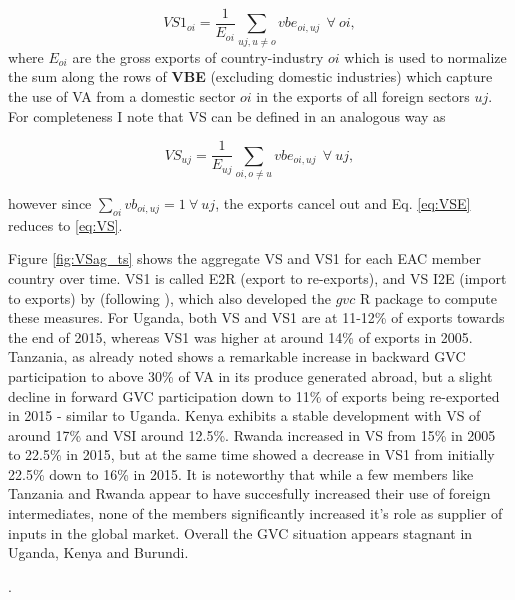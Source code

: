 \documentclass[a4paper]{article}
\begin{document}
\begin{equation} \label{eq:VS1}
VS1_{oi} = \frac{1}{E_{oi}} \sum_{uj, u \neq  o} vbe_{oi, uj}\ \ \forall\ oi,
\end{equation}
where $E_{oi}$ are the gross exports of country-industry $oi$ which is used to normalize the sum along the rows of \textbf{VBE} (excluding domestic industries) which capture the use of VA from a domestic sector $oi$ in the exports of all foreign sectors $uj$. For completeness I note that VS can be defined in an analogous way as

\begin{equation} \label{eq:VSE}
VS_{uj} = \frac{1}{E_{uj}} \sum_{oi, o \neq  u} vbe_{oi, uj}\ \ \forall\ uj,
\end{equation}

however since $\sum_{oi} vb_{oi, uj} = 1\ \forall\ uj$, the exports cancel out and Eq. \ref{eq:VSE} reduces to \ref{eq:VS}. \newline

Figure \ref{fig:VSag_ts} shows the aggregate VS and VS1 for each EAC member country over time. VS1 is called E2R (export to re-exports), and VS I2E (import to exports) by \citet{Kummritz20162} (following \citet{baldwin2015supply}), which also developed the $gvc$ R package to compute these measures. For Uganda, both VS and VS1 are at 11-12\% of exports towards the end of 2015, whereas VS1 was higher at around 14\% of exports in 2005. Tanzania, as already noted shows a remarkable increase in backward GVC participation to above 30\% of VA in its produce generated abroad, but a slight decline in forward GVC participation down to 11\% of exports being re-exported in 2015 - similar to Uganda. Kenya exhibits a stable development with VS of around 17\% and VSI around 12.5\%. Rwanda increased in VS from 15\% in 2005 to 22.5\% in 2015, but at the same time showed a decrease in VS1 from initially 22.5\% down to 16\% in 2015. It is noteworthy that while a few members like Tanzania and Rwanda appear to have succesfully increased their use of foreign intermediates, none of the members significantly increased it's role as supplier of inputs in the global market. Overall the GVC situation appears stagnant in Uganda, Kenya and Burundi. 

. 
\end{document}
